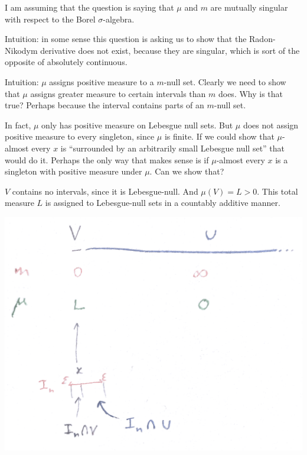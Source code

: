 I am assuming that the question is saying that $\mu$ and $m$ are mutually singular with respect to the
Borel $\sigma$-algebra.

Intuition: in some sense this question is asking us to show that the Radon-Nikodym derivative does not exist,
because they are singular, which is sort of the opposite of absolutely continuous.

Intuition: $\mu$ assigns positive measure to a $m$-null set. Clearly we need to show that $\mu$ assigns greater
measure to certain intervals than $m$ does. Why is that true? Perhaps because the interval contains parts of
an $m$-null set.

In fact, $\mu$ only has positive measure on Lebesgue null sets. But $\mu$ does not assign positive measure to
every singleton, since $\mu$ is finite. If we could show that $\mu$-almost every $x$ is ``surrounded by an
arbitrarily small Lebesgue null set​'' that would do it. Perhaps the only way that makes sense is if
$\mu$-almost every $x$ is a singleton with positive measure under $\mu$. Can we show that?

$V$ contains no intervals, since it is Lebesgue-null. And $\mu(V) = L > 0$. This total measure $L$ is assigned
to Lebesgue-null sets in a countably additive manner.

\begin{mdframed}
\includegraphics[width=400pt]{img/analysis--berkeley-202a-final-fe0f.png}
\end{mdframed}

